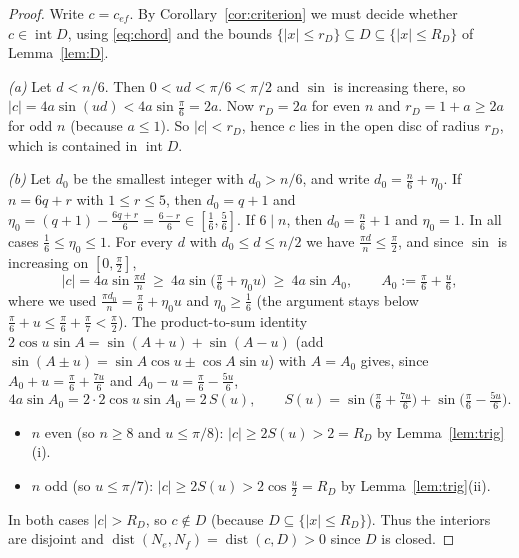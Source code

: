 \documentclass[11pt,a4paper]{article}
\theoremstyle{definition}
\theoremstyle{remark}
\DeclareMathOperator{\dist}{dist}
\newcommand{\inter}{\operatorname{int}}
\begin{document}
\begin{proof}
Write $c=c_{ef}$. By Corollary~\ref{cor:criterion} we must decide whether $c\in\inter D$, using \eqref{eq:chord} and the bounds $\{|x|\le r_D\}\subseteq D\subseteq\{|x|\le R_D\}$ of Lemma~\ref{lem:D}.

\emph{(a)} Let $d<n/6$. Then $0<ud<\pi/6<\pi/2$ and $\sin$ is increasing there, so $|c|=4a\sin(ud)<4a\sin\tfrac\pi6=2a$.
Now $r_D=2a$ for even $n$ and $r_D=1+a\ge2a$ for odd $n$ (because $a\le1$). So $|c|<r_D$, hence $c$ lies in the open disc of radius $r_D$, which is contained in $\inter D$.

\emph{(b)} Let $d_0$ be the smallest integer with $d_0>n/6$, and write $d_0=\tfrac n6+\eta_0$.
If $n=6q+r$ with $1\le r\le5$, then $d_0=q+1$ and $\eta_0=(q+1)-\tfrac{6q+r}6=\tfrac{6-r}6\in[\tfrac16,\tfrac56]$. If $6\mid n$, then $d_0=\tfrac n6+1$ and $\eta_0=1$. In all cases $\tfrac16\le\eta_0\le1$.
For every $d$ with $d_0\le d\le n/2$ we have $\tfrac{\pi d}n\le\tfrac\pi2$, and since $\sin$ is increasing on $[0,\tfrac\pi2]$,
\[
|c|=4a\sin\tfrac{\pi d}n\ \ge\ 4a\sin\big(\tfrac\pi6+\eta_0u\big)\ \ge\ 4a\sin A_0,\qquad A_0:=\tfrac\pi6+\tfrac u6,
\]
where we used $\tfrac{\pi d_0}{n}=\tfrac\pi6+\eta_0u$ and $\eta_0\ge\tfrac16$ (the argument stays below $\frac\pi6+u\le\frac\pi6+\frac\pi7<\frac\pi2$).
The product-to-sum identity $2\cos u\sin A=\sin(A+u)+\sin(A-u)$ (add $\sin(A\pm u)=\sin A\cos u\pm\cos A\sin u$) with $A=A_0$ gives, since $A_0+u=\tfrac\pi6+\tfrac{7u}6$ and $A_0-u=\tfrac\pi6-\tfrac{5u}6$,
\[
4a\sin A_0=2\cdot2\cos u\sin A_0=2\,S(u),\qquad S(u)=\sin\!\big(\tfrac\pi6+\tfrac{7u}6\big)+\sin\!\big(\tfrac\pi6-\tfrac{5u}6\big).
\]
\begin{itemize}[nosep]
\item $n$ even (so $n\ge8$ and $u\le\pi/8$): $|c|\ge2S(u)>2=R_D$ by Lemma~\ref{lem:trig}(i).
\item $n$ odd (so $u\le\pi/7$): $|c|\ge2S(u)>2\cos\tfrac u2=R_D$ by Lemma~\ref{lem:trig}(ii).
\end{itemize}
In both cases $|c|>R_D$, so $c\notin D$ (because $D\subseteq\{|x|\le R_D\}$). Thus the interiors are disjoint and $\dist(N_e,N_f)=\dist(c,D)>0$ since $D$ is closed.


\end{proof}
\end{document}
